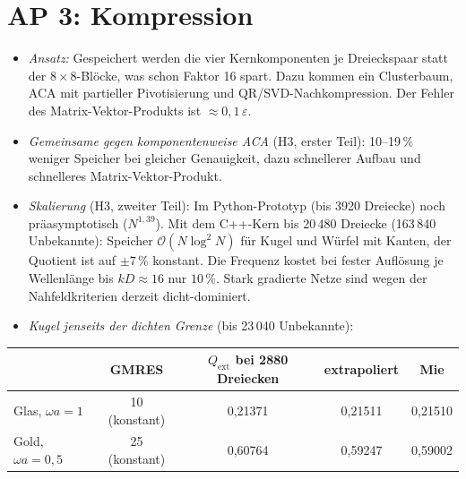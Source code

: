 \documentclass[11pt, a4paper]{article}
\begin{document}
\section{AP 3: Kompression}
\begin{itemize}[leftmargin=*]
  \item \emph{Ansatz:} Gespeichert werden die vier Kernkomponenten je Dreieckspaar statt der
    $8\times8$-Blöcke, was schon Faktor 16 spart. Dazu kommen ein Clusterbaum, ACA mit
    partieller Pivotisierung und QR/SVD-Nachkompression. Der Fehler des
    Matrix-Vektor-Produkts ist $\approx0{,}1\,\varepsilon$.
  \item \emph{Gemeinsame gegen komponentenweise ACA} (H3, erster Teil): 10--19\,\% weniger
    Speicher bei gleicher Genauigkeit, dazu schnellerer Aufbau und schnelleres
    Matrix-Vektor-Produkt.
  \item \emph{Skalierung} (H3, zweiter Teil): Im Python-Prototyp (bis 3920 Dreiecke) noch
    präasymptotisch ($N^{1{,}39}$). Mit dem C++-Kern bis 20\,480 Dreiecke (163\,840 Unbekannte):
    Speicher $\mathcal{O}(N\log^2N)$ für Kugel und Würfel mit Kanten, der Quotient ist auf
    $\pm7\,\%$ konstant. Die Frequenz kostet bei fester Auflösung je Wellenlänge bis $kD\approx16$ nur
    $10\,\%$. Stark gradierte Netze sind wegen der Nahfeldkriterien derzeit dicht-dominiert.
  \item \emph{Kugel jenseits der dichten Grenze} (bis 23\,040 Unbekannte):
\end{itemize}
\begin{center}\small
\begin{tabular}{lcccc}
\toprule
& GMRES & $Q_{\mathrm{ext}}$ bei 2880 Dreiecken & extrapoliert & Mie\\
\midrule
Glas, $\omega a=1$ & 10 (konstant) & 0,21371 & 0,21511 & 0,21510\\
Gold, $\omega a=0{,}5$ & 25 (konstant) & 0,60764 & 0,59247 & 0,59002\\
\bottomrule
\end{tabular}
\end{center}
\end{document}
